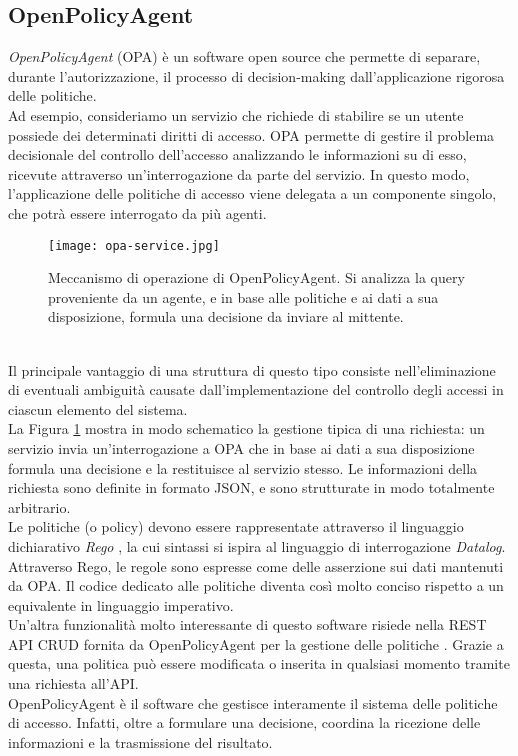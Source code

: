 \subsection{OpenPolicyAgent} \label{opa_intro}
\textit{OpenPolicyAgent} (OPA) \cite{opa_bib} è un software open source che permette di separare, durante l'autorizzazione, il processo di
 decision-making  dall'applicazione rigorosa delle politiche.
\\ Ad esempio, consideriamo un servizio che richiede di stabilire se un utente possiede dei determinati diritti di accesso.
OPA permette di gestire il problema decisionale del controllo dell'accesso analizzando le informazioni su di esso, ricevute attraverso un'interrogazione da parte del servizio. 
In questo modo, l'applicazione delle politiche di accesso viene delegata a un componente singolo, che potrà essere interrogato da più 
agenti.
\begin{figure}[h]
    \texttt{[image: opa-service.jpg]}
    \centering
    \caption[Meccanismo di operazione di OPA]{Meccanismo di operazione di OpenPolicyAgent. Si analizza la query proveniente da un agente, e in base alle politiche e ai dati a sua disposizione, formula una decisione da inviare al mittente. }
    \label{OPAWork}
\end{figure} 
\\ Il principale vantaggio di una struttura di questo tipo consiste nell'eliminazione di eventuali ambiguità
 causate dall'implementazione del controllo degli accessi in ciascun elemento del sistema. 
\\La Figura \ref*{OPAWork} mostra in modo schematico la gestione tipica di una richiesta: un servizio invia un'interrogazione
 a OPA che in base ai dati a sua disposizione formula una decisione e la restituisce al servizio stesso. 
Le informazioni della richiesta sono definite in formato JSON, e sono strutturate in modo totalmente arbitrario. 
\\ Le politiche (o policy) devono essere rappresentate attraverso il linguaggio dichiarativo 
\textit{Rego} \cite{rego_doc}, la cui sintassi si ispira al linguaggio 
di interrogazione \textit{Datalog}. 
Attraverso Rego, le regole sono espresse come delle asserzione sui dati mantenuti da OPA.
Il codice dedicato alle politiche diventa così molto conciso rispetto a un equivalente in 
linguaggio imperativo. 
\\ Un'altra funzionalità molto interessante di questo software risiede nella REST API CRUD fornita da OpenPolicyAgent per la gestione delle politiche \cite{opa_api}. Grazie a questa, una politica può essere modificata o inserita 
in qualsiasi momento tramite una richiesta all'API. 
\\ OpenPolicyAgent è il software che gestisce interamente il sistema delle politiche di accesso. Infatti, oltre a formulare una decisione, 
coordina la ricezione delle informazioni e la trasmissione del risultato.  


